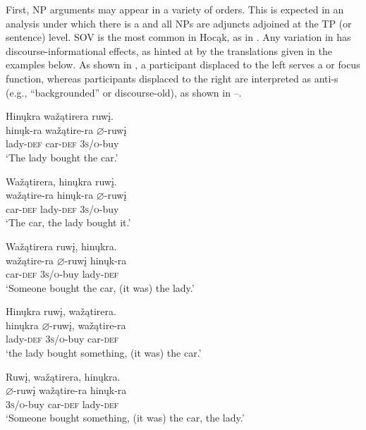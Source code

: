 \documentclass[output=paper]{LSP/langsci}
\begin{document}
First, NP arguments may appear in a variety of orders.  This is expected in an analysis under which there is a  and all NPs are adjuncts adjoined at the TP (or sentence) level. SOV  is the most common in Hocąk, as in . Any variation in  has discourse-informational effects, as hinted at by the  translations given in the examples below. As shown in , a participant displaced to the left serves a  or focus function, whereas participants displaced to the right are interpreted as anti-s (e.g., ``backgrounded'' or discourse-old), as shown in --.
 

\let\eachwordtwo=\itshape

\ea
\label{ex:jrs:11} 
\glll Hin\k{u}kra wa\v{z}ątirera ruw\k{i}.  \\
hin\k{u}k-ra	wa\v{z}ątire-ra 	$\varnothing$-ruw\k{i} \\
lady-\textsc{def}	car-\textsc{def}	 \textsc{3s/o}-buy \\
\trans `The lady bought the car.'
\z

\ea\label{ex:jrs:12}
\ea\label{ex:jrs:12a}
\glll Wa\v{z}ątirera,	hin\k{u}kra		ruw\k{i}. \\
wa\v{z}ątire-ra 	hin\k{u}k-ra		$\varnothing$-ruw\k{i} \\
car-\textsc{def}			lady-\textsc{def}		\textsc{3s/o}-buy \\
\trans `The car, the lady bought it.' 

\ex\label{ex:jrs:12b}
\glll Wa\v{z}ątirera		ruw\k{i},			hin\k{u}kra.\\
wa\v{z}ątire-ra	$\varnothing$-ruw\k{i}	hin\k{u}k-ra \\
car-\textsc{def} 			\textsc{3s/o}-buy 	lady-\textsc{def} \\
\trans `Someone bought the car, (it was) the lady.' 

\ex\label{ex:jrs:12c}
\glll Hin\k{u}kra 		ruw\k{i}, 		wa\v{z}ątirera. \\
hin\k{u}kra 	$\varnothing$-ruw\k{i}, 		wa\v{z}ątire-ra \\
lady-\textsc{def} \textsc{3s/o}-buy car-\textsc{def} \\
\trans `the lady bought something, (it was) the car.' 

\ex\label{ex:jrs:12d}
\glll Ruw\k{i}, 		wa\v{z}ątirera,	hin\k{u}kra.\\
$\varnothing$-ruw\k{i}	wa\v{z}ątire-ra	hin\k{u}k-ra \\
\textsc{3s/o}-buy car-\textsc{def} lady-\textsc{def} \\
\trans `Someone bought something, (it was) the car, the lady.' 
\end{document}
